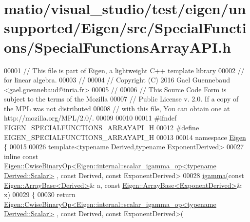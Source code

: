 \hypertarget{matio_2visual__studio_2test_2eigen_2unsupported_2_eigen_2src_2_special_functions_2_special_functions_array_a_p_i_8h_source}{}\section{matio/visual\+\_\+studio/test/eigen/unsupported/\+Eigen/src/\+Special\+Functions/\+Special\+Functions\+Array\+A\+PI.h}
\label{matio_2visual__studio_2test_2eigen_2unsupported_2_eigen_2src_2_special_functions_2_special_functions_array_a_p_i_8h_source}

\begin{DoxyCode}
00001 \textcolor{comment}{// This file is part of Eigen, a lightweight C++ template library}
00002 \textcolor{comment}{// for linear algebra.}
00003 \textcolor{comment}{//}
00004 \textcolor{comment}{// Copyright (C) 2016 Gael Guennebaud <gael.guennebaud@inria.fr>}
00005 \textcolor{comment}{//}
00006 \textcolor{comment}{// This Source Code Form is subject to the terms of the Mozilla}
00007 \textcolor{comment}{// Public License v. 2.0. If a copy of the MPL was not distributed}
00008 \textcolor{comment}{// with this file, You can obtain one at http://mozilla.org/MPL/2.0/.}
00009 
00010 
00011 \textcolor{preprocessor}{#ifndef EIGEN\_SPECIALFUNCTIONS\_ARRAYAPI\_H}
00012 \textcolor{preprocessor}{#define EIGEN\_SPECIALFUNCTIONS\_ARRAYAPI\_H}
00013 
00014 \textcolor{keyword}{namespace }\hyperlink{namespace_eigen}{Eigen} \{
00015 
00026 \textcolor{keyword}{template}<\textcolor{keyword}{typename} Derived,\textcolor{keyword}{typename} ExponentDerived>
00027 \textcolor{keyword}{inline} \textcolor{keyword}{const} 
      \hyperlink{group___core___module_class_eigen_1_1_cwise_binary_op}{Eigen::CwiseBinaryOp<Eigen::internal::scalar\_igamma\_op<typename Derived::Scalar>}
      , \textcolor{keyword}{const} Derived, \textcolor{keyword}{const} ExponentDerived>
00028 \hyperlink{namespace_eigen_af5aa651137636b1cdbd27de1cfe91148}{igamma}(\textcolor{keyword}{const} \hyperlink{group___core___module_class_eigen_1_1_array_base}{Eigen::ArrayBase<Derived>}& a, \textcolor{keyword}{const} 
      \hyperlink{group___core___module_class_eigen_1_1_array_base}{Eigen::ArrayBase<ExponentDerived>}& x)
00029 \{
00030   \textcolor{keywordflow}{return} 
      \hyperlink{group___core___module_class_eigen_1_1_cwise_binary_op}{Eigen::CwiseBinaryOp<Eigen::internal::scalar\_igamma\_op<typename Derived::Scalar>}
      , \textcolor{keyword}{const} Derived, \textcolor{keyword}{const} ExponentDerived>(

\end{DoxyCode}
